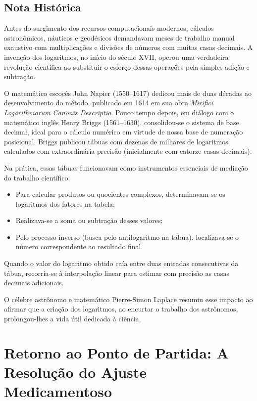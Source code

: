 \documentclass[12pt,a4paper]{report}
\begin{document}
	\section{Nota Histórica}
	\begin{destaque}
		Antes do surgimento dos recursos computacionais modernos, cálculos astronômicos, náuticos e geodésicos demandavam meses de trabalho manual exaustivo com multiplicações e divisões de números com muitas casas decimais. A invenção dos logaritmos, no início do século XVII, operou uma verdadeira revolução científica ao substituir o esforço dessas operações pela simples adição e subtração.
		
		O matemático escocês John Napier (1550--1617) dedicou mais de duas décadas ao desenvolvimento do método, publicado em 1614 em sua obra \textit{Mirifici Logarithmorum Canonis Descriptio}. Pouco tempo depois, em diálogo com o matemático inglês Henry Briggs (1561--1630), consolidou-se o sistema de base decimal, ideal para o cálculo numérico em virtude de nossa base de numeração posicional. Briggs publicou tábuas com dezenas de milhares de logaritmos calculados com extraordinária precisão (inicialmente com catorze casas decimais).
		
		Na prática, essas tábuas funcionavam como instrumentos essenciais de mediação do trabalho científico:
		\begin{itemize}[label=$\circ$]
			\item Para calcular produtos ou quocientes complexos, determinavam-se os logaritmos dos fatores na tabela;
			\item Realizava-se a soma ou subtração desses valores;
			\item Pelo processo inverso (busca pelo antilogaritmo na tábua), localizava-se o número correspondente ao resultado final.
		\end{itemize}
		
		Quando o valor do logaritmo obtido caía entre duas entradas consecutivas da tábua, recorria-se à interpolação linear para estimar com precisão as casas decimais adicionais. 
		
		O célebre astrônomo e matemático Pierre-Simon Laplace resumiu esse impacto ao afirmar que a criação dos logaritmos, ao encurtar o trabalho dos astrônomos, prolongou-lhes a vida útil dedicada à ciência.
	\end{destaque}
	
	
	\chapter{Retorno ao Ponto de Partida: A Resolução do Ajuste Medicamentoso}
	
\end{document}
